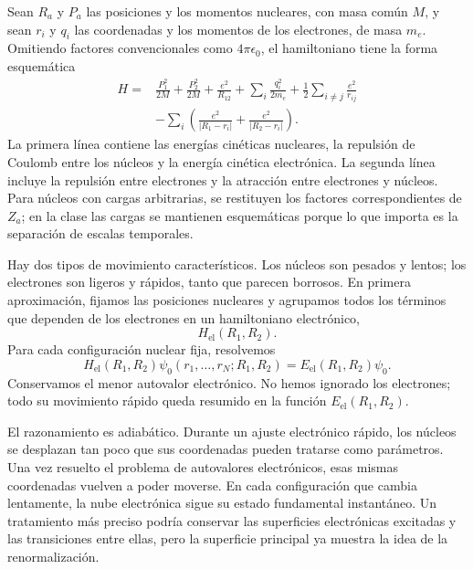 Sean \(R_a\) y \(P_a\) las posiciones y los momentos nucleares, con masa común \(M\), y sean \(r_i\) y \(q_i\) las coordenadas y los momentos de los electrones, de masa \(m_e\). Omitiendo factores convencionales como \(4\pi\epsilon_0\), el hamiltoniano tiene la forma esquemática
\begin{align}
H={}&
\frac{P_1^2}{2M}+\frac{P_2^2}{2M}
+\frac{e^2}{R_{12}}
+\sum_i\frac{q_i^2}{2m_e}
+\frac12\sum_{i\ne j}\frac{e^2}{r_{ij}}
\nonumber\\
&-\sum_i\left(
\frac{e^2}{|R_1-r_i|}
+\frac{e^2}{|R_2-r_i|}
\right).
\label{eq:molecular-hamiltonian}
\end{align}
La primera línea contiene las energías cinéticas nucleares, la repulsión de Coulomb entre los núcleos y la energía cinética electrónica. La segunda línea incluye la repulsión entre electrones y la atracción entre electrones y núcleos. Para núcleos con cargas arbitrarias, se restituyen los factores correspondientes de \(Z_a\); en la clase las cargas se mantienen esquemáticas porque lo que importa es la separación de escalas temporales.

Hay dos tipos de movimiento característicos. Los núcleos son pesados y lentos; los electrones son ligeros y rápidos, tanto que parecen borrosos. En primera aproximación, fijamos las posiciones nucleares y agrupamos todos los términos que dependen de los electrones en un hamiltoniano electrónico,
\begin{equation}
H_{\mathrm{el}}(R_1,R_2).
\end{equation}
Para cada configuración nuclear fija, resolvemos
\begin{equation}
H_{\mathrm{el}}(R_1,R_2)
\psi_0(r_1,\ldots,r_N;R_1,R_2)
=
E_{\mathrm{el}}(R_1,R_2)\psi_0.
\label{eq:electronic-ground-state}
\end{equation}
Conservamos el menor autovalor electrónico. No hemos ignorado los electrones; todo su movimiento rápido queda resumido en la función \(E_{\mathrm{el}}(R_1,R_2)\).

El razonamiento es adiabático. Durante un ajuste electrónico rápido, los núcleos se desplazan tan poco que sus coordenadas pueden tratarse como parámetros. Una vez resuelto el problema de autovalores electrónicos, esas mismas coordenadas vuelven a poder moverse. En cada configuración que cambia lentamente, la nube electrónica sigue su estado fundamental instantáneo. Un tratamiento más preciso podría conservar las superficies electrónicas excitadas y las transiciones entre ellas, pero la superficie principal ya muestra la idea de la renormalización.

